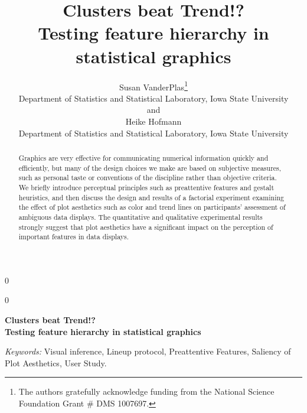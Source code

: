 \documentclass[12pt]{article}\usepackage[]{graphicx}\usepackage[]{color}
\newcommand{\blind}{0}
\begin{document}
%

\def\spacingset#1{\renewcommand{\baselinestretch}%
{#1}\small\normalsize} \spacingset{1}



\blind
{
  \title{\bf Clusters beat Trend!? \\Testing feature hierarchy in statistical graphics}
  \author{Susan VanderPlas\thanks{
    The authors gratefully acknowledge funding from the National Science Foundation Grant \# DMS 1007697.}\hspace{.2cm}\\
    Department of Statistics and Statistical Laboratory, Iowa State University\\
    and \\
    Heike Hofmann\\
    Department of Statistics and Statistical Laboratory, Iowa State University}
  \maketitle
} \fi

\blind
{
  \bigskip
  \bigskip
  \bigskip
  \begin{center}
    {\LARGE\bf Clusters beat Trend!? \\Testing feature hierarchy in statistical graphics}
\end{center}
  \medskip
} \fi

\bigskip
\begin{abstract}
Graphics are very effective for communicating numerical information quickly and efficiently, but many of the design choices we make are based on subjective measures, such as personal taste or conventions of the discipline rather than objective criteria. We briefly introduce perceptual principles such as preattentive features and gestalt heuristics, and then discuss the design and results of a factorial experiment examining the effect of plot aesthetics such as color and trend lines on participants' assessment of ambiguous data displays. The quantitative and qualitative experimental results strongly suggest that plot aesthetics have a significant impact on the perception of important features in data displays. 
\end{abstract}

\noindent%
{\it Keywords:}  Visual inference, Lineup protocol, Preattentive Features, Saliency of Plot Aesthetics, User Study.
\vfill
\end{document}
